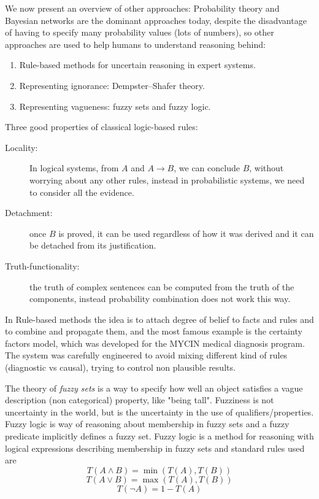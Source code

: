 We now present an overview of other approaches:
Probability theory and Bayesian networks are the dominant approaches today, despite
the disadvantage of having to specify many probability values (lots of numbers), so
other approaches are used to help humans to understand reasoning behind:
\begin{enumerate}
    \item Rule-based methods for uncertain reasoning in expert systems.
    \item Representing ignorance: Dempster–Shafer theory.
    \item Representing vagueness: fuzzy sets and fuzzy logic.
\end{enumerate}
Three good properties of classical logic-based rules:
\begin{description}
    \item [Locality: ] In logical systems, from $A$ and $A \to B$, we can conclude $B$,
	              without worrying about any other rules, instead in probabilistic systems,                      we need to consider all the evidence.
   \item [Detachment: ] once $B$ is proved, it can be used regardless of how it was derived and
	               it can be detached from its justification.
   \item [Truth-functionality: ] the truth of complex sentences can be computed from the
	          truth of the components, instead probability combination
		  does not work this way.
\end{description}
In Rule-based methods the idea is to attach degree of belief to facts and rules and 
to combine and propagate them, and the most famous example is the certainty factors model,
which was developed for the MYCIN medical diagnosis program.\newline
The system was carefully engineered to avoid mixing different kind of rules 
(diagnostic vs causal), trying to control non plausible results.

The theory of \emph{fuzzy sets} is a way to specify how well an object satisfies a vague
description (non categorical) property, like "being tall".\newline
Fuzziness is not uncertainty in the world, but is the uncertainty
in the use of qualifiers/properties.\newline
Fuzzy logic is way of reasoning about membership in fuzzy sets and a fuzzy predicate
implicitly defines a fuzzy set.\newline
Fuzzy logic is a method for reasoning with logical expressions describing
membership in fuzzy sets and standard rules used are 
\[ T(A \land B) = \min (T(A), T(B)) \]
\[ T(A \lor B) = \max (T(A), T(B)) \]
\[ T(\neg A) = 1 - T(A) \]

